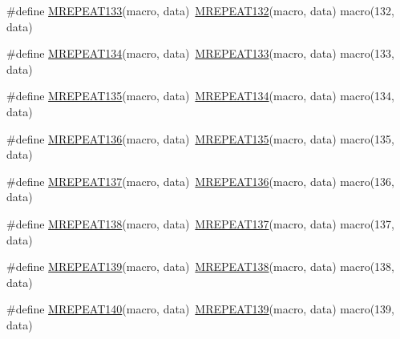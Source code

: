 \begin{DoxyCompactItemize}
\item 
\#define \mbox{\hyperlink{group__group__sam0__utils__mrepeat_ga808576086998ab3ae33981a5b7a28c4c}{M\+R\+E\+P\+E\+A\+T133}}(macro,  data)~\mbox{\hyperlink{group__group__sam0__utils__mrepeat_ga70b3e029b2ca5370d287a710ba66cba3}{M\+R\+E\+P\+E\+A\+T132}}(macro, data)   macro(132, data)
\item 
\#define \mbox{\hyperlink{group__group__sam0__utils__mrepeat_gad697f86f8799147acde4ca488f87b446}{M\+R\+E\+P\+E\+A\+T134}}(macro,  data)~\mbox{\hyperlink{group__group__sam0__utils__mrepeat_ga808576086998ab3ae33981a5b7a28c4c}{M\+R\+E\+P\+E\+A\+T133}}(macro, data)   macro(133, data)
\item 
\#define \mbox{\hyperlink{group__group__sam0__utils__mrepeat_ga34c93ca93d79b5955fda5a08fd758e22}{M\+R\+E\+P\+E\+A\+T135}}(macro,  data)~\mbox{\hyperlink{group__group__sam0__utils__mrepeat_gad697f86f8799147acde4ca488f87b446}{M\+R\+E\+P\+E\+A\+T134}}(macro, data)   macro(134, data)
\item 
\#define \mbox{\hyperlink{group__group__sam0__utils__mrepeat_ga57d2b47fe36fbbfeb3dc2d4d7aefaeb1}{M\+R\+E\+P\+E\+A\+T136}}(macro,  data)~\mbox{\hyperlink{group__group__sam0__utils__mrepeat_ga34c93ca93d79b5955fda5a08fd758e22}{M\+R\+E\+P\+E\+A\+T135}}(macro, data)   macro(135, data)
\item 
\#define \mbox{\hyperlink{group__group__sam0__utils__mrepeat_gaea5f05e5377ed7f7628b6b5bba397523}{M\+R\+E\+P\+E\+A\+T137}}(macro,  data)~\mbox{\hyperlink{group__group__sam0__utils__mrepeat_ga57d2b47fe36fbbfeb3dc2d4d7aefaeb1}{M\+R\+E\+P\+E\+A\+T136}}(macro, data)   macro(136, data)
\item 
\#define \mbox{\hyperlink{group__group__sam0__utils__mrepeat_ga26e5d13baa4707214f4782d3acc0f231}{M\+R\+E\+P\+E\+A\+T138}}(macro,  data)~\mbox{\hyperlink{group__group__sam0__utils__mrepeat_gaea5f05e5377ed7f7628b6b5bba397523}{M\+R\+E\+P\+E\+A\+T137}}(macro, data)   macro(137, data)
\item 
\#define \mbox{\hyperlink{group__group__sam0__utils__mrepeat_gaec99878cdc5458427287a040044924d3}{M\+R\+E\+P\+E\+A\+T139}}(macro,  data)~\mbox{\hyperlink{group__group__sam0__utils__mrepeat_ga26e5d13baa4707214f4782d3acc0f231}{M\+R\+E\+P\+E\+A\+T138}}(macro, data)   macro(138, data)
\item 
\#define \mbox{\hyperlink{group__group__sam0__utils__mrepeat_ga040d95ace740614458cf565fe5cd29f4}{M\+R\+E\+P\+E\+A\+T140}}(macro,  data)~\mbox{\hyperlink{group__group__sam0__utils__mrepeat_gaec99878cdc5458427287a040044924d3}{M\+R\+E\+P\+E\+A\+T139}}(macro, data)   macro(139, data)

\end{DoxyCompactItemize}
